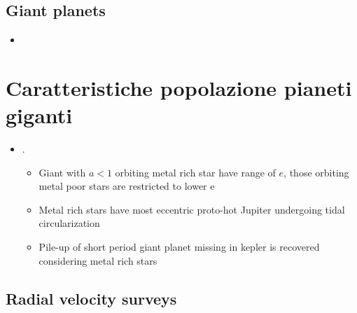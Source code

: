 \documentclass[main.tex]{subfiles}
\begin{document}
\section{Giant planets}

\cite{santerne2018populations}
\begin{itemize}
    \item 
\end{itemize}

\chapter{Caratteristiche popolazione pianeti giganti}

\begin{itemize}
    \item \cite{dawson2013giant}.
    \begin{itemize}
        \item Giant with $a<1$ orbiting metal rich star have range of $e$, those orbiting metal poor stars are restricted to lower e
        \item Metal rich stars have most eccentric proto-hot Jupiter undergoing tidal circularization
        \item Pile-up of short period giant planet missing in kepler is recovered considering metal rich stars
    \end{itemize}
\end{itemize}

\section{Radial velocity surveys}
\end{document}

